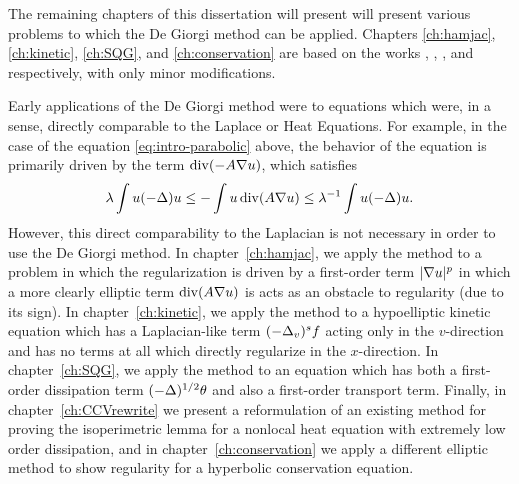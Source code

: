 The remaining chapters of this dissertation will present will present various problems to which the De Giorgi method can be applied.  Chapters \ref{ch:hamjac}, \ref{ch:kinetic}, \ref{ch:SQG}, and \ref{ch:conservation} are based on the works \cite{StVa.hamjac}, \cite{St.hypo}, \cite{StVa.sqg}, and \cite{St.shocks} respectively, with only minor modifications.  

Early applications of the De Giorgi method were to equations which were, in a sense, directly comparable to the Laplace or Heat Equations.  For example, in the case of the equation \eqref{eq:intro-parabolic} above, the behavior of the equation is primarily driven by the term $\operatorname{div}(-A \nabla u)$, which satisfies
\[ \lambda \int u (-\Delta) u \leq - \int u \operatorname{div}(A \nabla u) \leq \lambda^{-1} \int u (-\Delta) u. \]
However, this direct comparability to the Laplacian is not necessary in order to use the De Giorgi method.  In chapter~\ref{ch:hamjac}, we apply the method to a problem in which the regularization is driven by a first-order term $|\nabla u|^p$ in which a more clearly elliptic term $\operatorname{div}(A \nabla u)$ is acts as an obstacle to regularity (due to its sign).  In chapter~\ref{ch:kinetic}, we apply the method to a hypoelliptic kinetic equation which has a Laplacian-like term $(-\Delta_v)^s f$ acting only in the $v$-direction and has no terms at all which directly regularize in the $x$-direction.  In chapter~\ref{ch:SQG}, we apply the method to an equation which has both a first-order dissipation term $(-\Delta)^{1/2} \theta$ and also a first-order transport term.  Finally, in chapter~\ref{ch:CCVrewrite} we present a reformulation of an existing method for proving the isoperimetric lemma for a nonlocal heat equation with extremely low order dissipation, and in chapter~\ref{ch:conservation} we apply a different elliptic method to show regularity for a hyperbolic conservation equation.  


